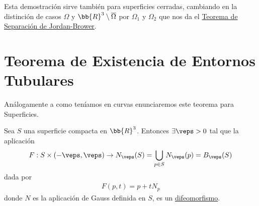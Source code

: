 \begin{observacion}
    Esta demostración sirve también para superficies cerradas, cambiando en la distinción de casos $\Omega$ y $\bb{R}^3 \setminus \overline{\Omega}$ por $\Omega_1$ y $\Omega_2$ que nos da el \hyperref[teo:sep_jordan_brower]{Teorema de Separación de Jordan-Brower}.
\end{observacion}

\section{Teorema de Existencia de Entornos Tubulares}

Análogamente a como teníamos en curvas enunciaremos este teorema para Superficies.

\begin{teo}
    Sea $S$ una superficie compacta en $\bb{R}^3$. Entonces $\exists \veps> 0$ tal que la aplicación
    \begin{gather*}
        F : S \times (-\veps, \veps) \to N_\veps(S) = \bigcup_{p\in S} N_\veps(p) = B_\veps(S)
    \end{gather*}
    dada por
    \begin{gather*}
        F(p,t) = p + tN_p
    \end{gather*}
    donde $N$ es la aplicación de Gauss definida en $S$, es un \underline{difeomorfismo}.
\end{teo}

